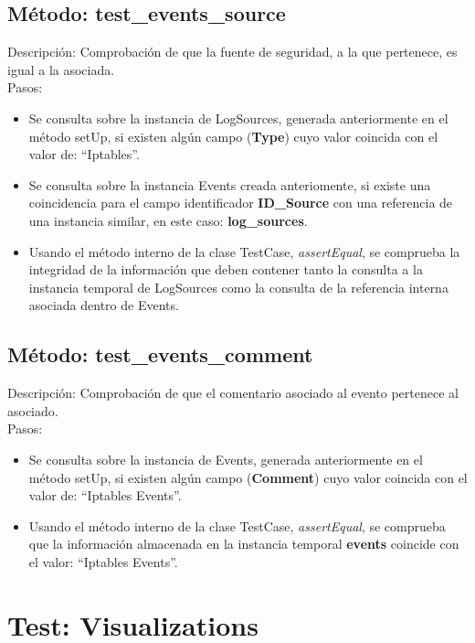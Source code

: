 \subsection{\quad Método: test\_events\_source}

Descripción: Comprobación de que la fuente de seguridad, a la que pertenece, es igual a la asociada.\\
Pasos:
\begin{itemize}
\item Se consulta sobre la instancia de LogSources, generada anteriormente en el método setUp, si existen algún campo (\textbf{Type}) cuyo valor coincida con el valor de: ``Iptables''.
\item Se consulta sobre la instancia Events creada anteriomente, si existe una coincidencia para el campo identificador \textbf{ID\_Source} con una referencia de una instancia similar, en este caso: \textbf{log\_sources}.
\item Usando el método interno de la clase TestCase, \emph{assertEqual}, se comprueba la integridad de la información que deben contener tanto la consulta a la instancia temporal de LogSources como la consulta de la referencia interna asociada dentro de Events.
\end{itemize}



\subsection{\quad Método: test\_events\_comment}

Descripción: Comprobación de que el comentario asociado al evento pertenece al asociado.\\
Pasos:
\begin{itemize}
\item Se consulta sobre la instancia de Events, generada anteriormente en el método setUp, si existen algún campo (\textbf{Comment}) cuyo valor coincida con el valor de: ``Iptables Events''.
\item Usando el método interno de la clase TestCase, \emph{assertEqual}, se comprueba que la información almacenada en la instancia temporal \textbf{events} coincide con el valor: ``Iptables Events''.
\end{itemize}



\section{\quad Test: Visualizations}

